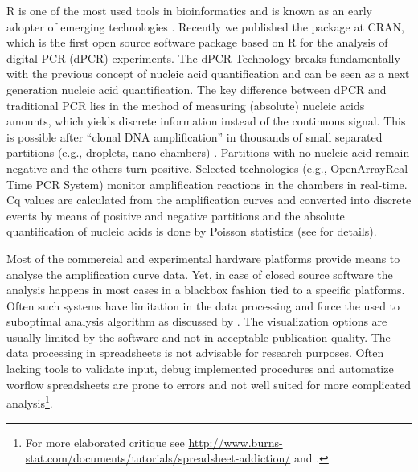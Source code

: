 R is one of the most used tools in bioinformatics and is known as an early 
adopter of emerging technologies \citep{pabinger_2014}. Recently we published 
the  package at CRAN, which is the first open source software 
package based on R for the analysis of digital PCR (dPCR) experiments. The dPCR 
Technology breaks fundamentally with the previous concept of nucleic acid 
quantification and can be seen as a next generation nucleic acid quantification. 
The key difference between dPCR and traditional PCR lies in the method of 
measuring (absolute) nucleic acids amounts, which yields discrete information
instead of the continuous signal. This is possible after ``clonal DNA 
amplification'' in thousands of small separated partitions (e.g., droplets, nano 
chambers) \citep{huggett_2013, milbury_2014, morley_2014}. Partitions with no 
nucleic acid remain negative and the others turn positive. Selected technologies 
(e.g., OpenArray\textregistered Real-Time PCR System) monitor amplification 
reactions in the chambers in real-time. Cq values are calculated from the 
amplification curves and converted into discrete events by means of positive and 
negative partitions and the absolute quantification of nucleic acids is done by 
Poisson statistics (see  for details).

Most of the commercial and experimental hardware platforms provide means to 
analyse the amplification curve data. Yet, in case of closed source software the 
analysis happens in most cases in a blackbox fashion tied to a specific 
platforms. Often such systems have limitation in the data processing and force 
the used to suboptimal analysis algorithm as discussed by \citet{ruijter_2013}. 
The visualization options are usually limited by the software and not in 
acceptable publication quality. The data processing in spreadsheets is not advisable 
for research purposes. Often lacking tools to validate input, debug implemented procedures
and automatize worflow spreadsheets are prone to errors and not well suited for more
complicated analysis\footnote{For more elaborated critique see 
\url{http://www.burns-stat.com/documents/tutorials/spreadsheet-addiction/} 
and \citet{mccullough_2008}.}.

